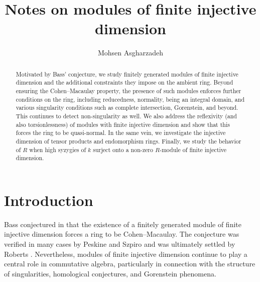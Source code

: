 \documentclass[10. pt,a4paper]{amsart}
\theoremstyle{definition}
\theoremstyle{remark}
\begin{document}
\author[M. Asgharzadeh]{Mohsen Asgharzadeh }

\title[Modules  of finite injective dimension]{Notes on modules of finite injective dimension}

\address{M. Asgharzadeh }






\begin{abstract}
	Motivated by Bass' conjecture, we study finitely generated modules of finite injective dimension and the additional constraints they impose on the ambient ring. Beyond ensuring the Cohen--Macaulay property, the presence of such modules enforces further conditions on the ring, including reducedness, normality, being an integral domain, and various singularity conditions such as complete intersection, Gorenstein, and beyond. This continues to detect non-singularity as well.
We also address the reflexivity (and also torsionlessness) of modules with finite injective dimension and show that this forces the ring to be quasi-normal. In the same vein, we investigate the injective dimension of tensor products and endomorphism rings. Finally, we study the behavior of $R$ when high syzygies of $k$ surject onto a non-zero $R$-module of finite injective dimension.
\end{abstract}

\maketitle
\tableofcontents

	
\section{Introduction}





Bass conjectured in \cite{bass} that the existence of a finitely generated module of finite injective dimension forces a ring to be Cohen--Macaulay. The conjecture was verified in many cases by Peskine and Szpiro \cite{PS} and was ultimately settled by Roberts \cite{int}. Nevertheless, modules of finite injective dimension continue to play a central role in commutative algebra, particularly in connection with the structure of singularities, homological conjectures, and Gorenstein phenomena.
\end{document}

